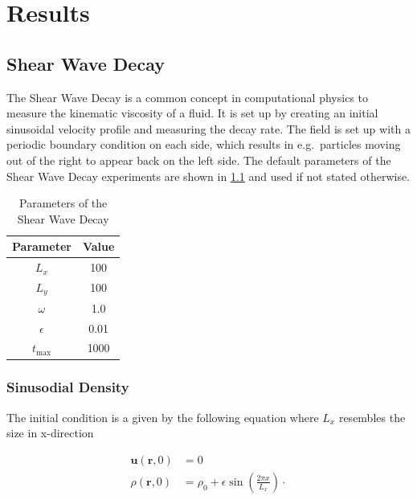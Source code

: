 \chapter{Results}\label{ch:results}


\section{Shear Wave Decay}
The Shear Wave Decay is a common concept in computational physics to measure the kinematic viscosity of a fluid.
It is set up by creating an initial sinusoidal velocity profile and measuring the decay rate.
The field is set up with a periodic boundary condition on each side, which results in e.g.\ particles moving out of the right to appear back on the left side.
The default parameters of the Shear Wave Decay experiments are shown in \cref{tab:swd-parameters} and used if not stated otherwise.

\begin{table}[H]
    \centering %
    \begin{tabular}{c c}
        \hline\hline %
        Parameter  & Value \\ [0.5ex] %
        \hline %
        $L_x$      & 100   \\
        $L_y$      & 100   \\
        $\omega$   & 1.0   \\
        $\epsilon$ & 0.01  \\
        $t_{\max}$ & 1000  \\ [1ex] %
        \hline %
    \end{tabular}
    \caption{Parameters of the Shear Wave Decay} %
    \label{tab:swd-parameters}
\end{table}

\subsection{Sinusodial Density}
The initial condition is a given by the following equation where $L_x$ resembles the size in x-direction

\begin{equation*}
    \begin{aligned}
        \mathbf{u}(\mathbf{r},0) &= 0 \\
        \rho(\mathbf{r},0) &= \rho_0 + \epsilon \sin \left( \frac{2 \pi x}{L_x} \right) \cdot
    \end{aligned}
\end{equation*}

